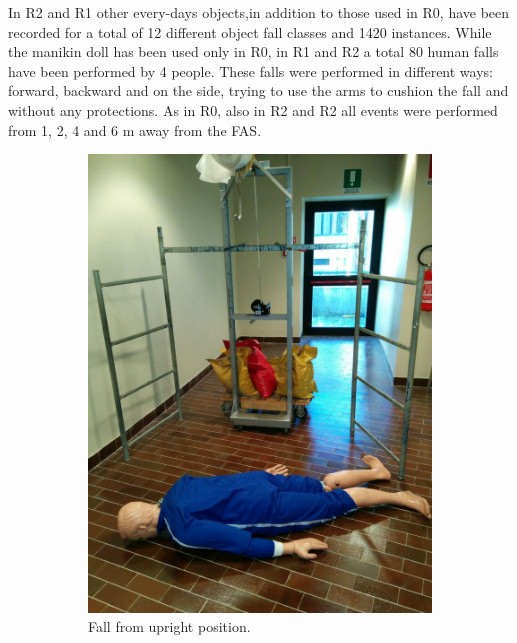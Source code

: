 In R2 and R1 other every-days objects,in addition to those used in R0, have been recorded for a total of 12 different object fall classes and 1420 instances. While the manikin doll has been used only in R0, in R1 and R2 a total 80 human falls have been performed by 4 people. These falls were performed in different ways: forward, backward and on the side, trying to use the arms to cushion the fall and without any protections. As in R0, also in R2 and R2 all events were performed from 1, 2, 4 and 6 m away from the FAS.

\begin{figure}[t]
	\centering
	\begin{subfigure}[b]{0.48\textwidth}
		\includegraphics[width=\textwidth]{img/impalcatura.jpg}
		\caption{Fall from upright position.}\label{fig:randy_upright}
	\end{subfigure}
	\begin{subfigure}[b]{0.48\textwidth}

\end{subfigure}
\end{figure}
